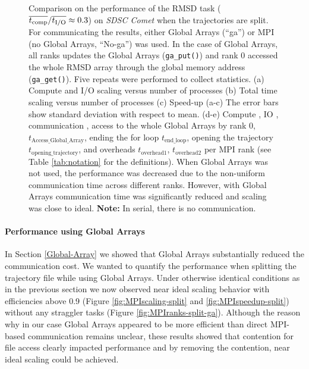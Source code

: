 \begin{figure}[ht!]
\caption{Comparison on the performance of the RMSD task ($\overline{{t}_{\text{comp}}}/\overline{{t}_{\text{I/O}}} \approx 0.3$) on \emph{SDSC Comet} when the trajectories are split. For communicating the results, either Global Arrays (``ga'') or MPI (no Global Arrays, ``No-ga'') was used.  In the case of Global Arrays, all ranks updates the Global Arrays (\texttt{ga\_put()}) and rank 0 accessed the whole RMSD array through the global memory address (\texttt{ga\_get()}).  Five repeats were performed to collect statistics. (a) Compute and I/O scaling versus number of processes (b) Total time scaling versus number of processes (c) Speed-up (a-c) The error bars show standard deviation with respect to mean. (d-e) Compute \tcomp, IO \tIO, communication \tcomm, access to the whole Global Arrays by rank 0, $t_{\text{Access\_Global\_Array}}$, ending the for loop $t_{\text{end\_loop}}$, opening the trajectory $t_{\text{opening\_trajectory}}$, and overheads $t_{\text{overhead1}}$, $t_{\text{overhead2}}$ per MPI rank (see Table \ref{tab:notation} for the definitions). When Global Arrays was not used, the performance was decreased due to the non-uniform communication time across different ranks. However, with Global Arrays communication time was significantly reduced and scaling was close to ideal. \textbf{Note:} In serial, there is no communication.}
\label{fig:MPIwithIO-split}
\end{figure}

\paragraph{Performance using Global Arrays}
In Section \ref{Global-Array} we showed that Global Arrays substantially reduced the communication cost. 
We wanted to quantify the performance when splitting the trajectory file while using Global Arrays.
Under otherwise identical conditions as in the previous section we now observed near ideal scaling behavior with efficiencies above 0.9 (Figure \ref{fig:MPIscaling-split} and \ref{fig:MPIspeedup-split}) without any straggler tasks (Figure \ref{fig:MPIranks-split-ga}).  
Although the reason why in our case Global Arrays appeared to be more efficient than direct MPI-based communication remains unclear, these results showed that contention for file access clearly impacted performance and by removing the contention, near ideal scaling could be achieved.

